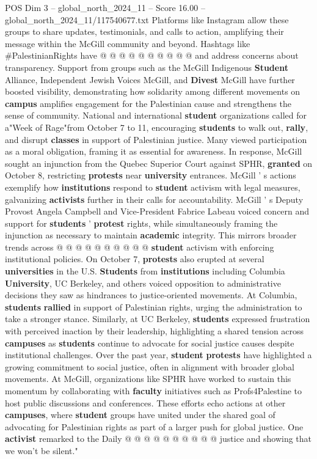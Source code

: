 \begin{textsample}{POS Dim 3 – global\_north\_2024\_11 – Score 16.00 – global\_north\_2024\_11/117540677.txt}
Platforms like Instagram allow these groups to share updates, testimonials, and calls to action, amplifying their message within the McGill community and beyond.
Hashtags like \#PalestinianRights have @ @ @ @ @ @ @ @ @ @ and address concerns about transparency.
Support from groups such as the McGill Indigenous \textbf{Student} Alliance, Independent Jewish Voices McGill, and \textbf{Divest} McGill have further boosted visibility, demonstrating how solidarity among different movements on \textbf{campus} amplifies engagement for the Palestinian cause and strengthens the sense of community.
National and international \textbf{student} organizations called for a"Week of Rage"from October 7 to 11, encouraging \textbf{students} to walk out, \textbf{rally}, and disrupt \textbf{classes} in support of Palestinian justice.
Many viewed participation as a moral obligation, framing it as essential for awareness.
In response, McGill sought an injunction from the Quebec Superior Court against SPHR, \textbf{granted} on October 8, restricting \textbf{protests} near \textbf{university} entrances.
McGill ' s actions exemplify how \textbf{institutions} respond to \textbf{student} activism with legal measures, galvanizing \textbf{activists} further in their calls for accountability.
McGill ' s Deputy Provost Angela Campbell and Vice-President Fabrice Labeau voiced concern and support for \textbf{students} ' \textbf{protest} rights, while simultaneously framing the injunction as necessary to maintain \textbf{academic} integrity.
This mirrors broader trends across @ @ @ @ @ @ @ @ @ @ \textbf{student} activism with enforcing institutional policies.
On October 7, \textbf{protests} also erupted at several \textbf{universities} in the U.S. \textbf{Students} from \textbf{institutions} including Columbia \textbf{University}, UC Berkeley, and others voiced opposition to administrative decisions they saw as hindrances to justice-oriented movements.
At Columbia, \textbf{students} \textbf{rallied} in support of Palestinian rights, urging the administration to take a stronger stance.
Similarly, at UC Berkeley, \textbf{students} expressed frustration with perceived inaction by their leadership, highlighting a shared tension across \textbf{campuses} as \textbf{students} continue to advocate for social justice causes despite institutional challenges.
Over the past year, \textbf{student} \textbf{protests} have highlighted a growing commitment to social justice, often in alignment with broader global movements.
At McGill, organizations like SPHR have worked to sustain this momentum by collaborating with \textbf{faculty} initiatives such as Profs4Palestine to host public discussions and conferences.
These efforts echo actions at other \textbf{campuses}, where \textbf{student} groups have united under the shared goal of advocating for Palestinian rights as part of a larger push for global justice.
One \textbf{activist} remarked to the Daily @ @ @ @ @ @ @ @ @ @ justice and showing that we won't be silent."

\end{textsample}
